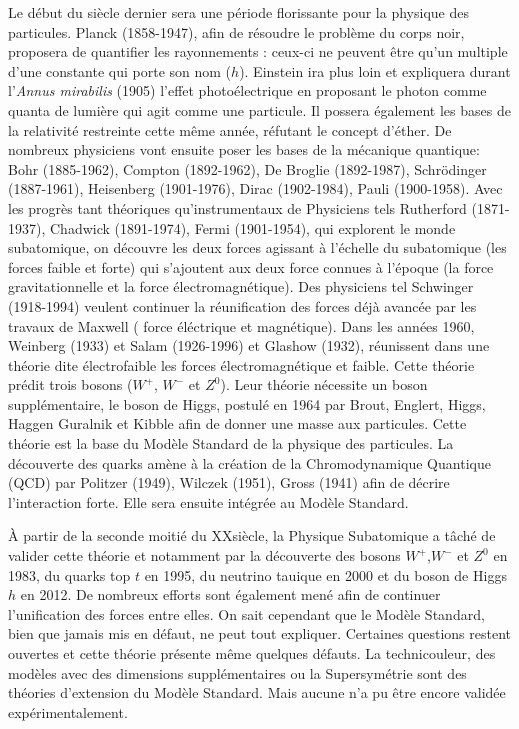 Le début du siècle dernier sera une période florissante pour la physique des particules. Planck (1858-1947), afin de résoudre le problème du corps noir, proposera de quantifier les rayonnements : ceux-ci ne peuvent être qu'un multiple d'une constante qui porte son nom ($h$). Einstein ira plus loin et expliquera durant l'\textit{Annus mirabilis} (1905) l'effet photoélectrique en proposant le photon comme quanta de lumière qui agit comme une particule. Il possera également les bases de la relativité restreinte cette même année, réfutant le concept d'éther. De nombreux physiciens vont ensuite poser les bases de la mécanique quantique: Bohr (1885-1962), Compton (1892-1962), De Broglie (1892-1987), Schrödinger (1887-1961), Heisenberg (1901-1976), Dirac (1902-1984), Pauli (1900-1958). Avec les progrès tant théoriques qu'instrumentaux de Physiciens tels  Rutherford (1871-1937), Chadwick (1891-1974), Fermi (1901-1954), qui explorent le monde subatomique, on découvre les deux forces agissant à l'échelle du subatomique (les forces faible et forte) qui s'ajoutent aux deux force connues à l'époque (la force gravitationnelle et la force électromagnétique). Des physiciens tel Schwinger (1918-1994) veulent continuer la réunification des forces déjà avancée par les travaux de Maxwell ( force éléctrique et magnétique). Dans les années 1960, Weinberg (1933) et Salam (1926-1996) et Glashow (1932), réunissent dans une théorie dite électrofaible les forces électromagnétique et faible. Cette théorie prédit trois bosons ($W^{+}$, $W^{-}$ et $Z^{0}$). Leur théorie nécessite un boson supplémentaire, le boson de Higgs, postulé en 1964 par Brout, Englert, Higgs, Haggen Guralnik et Kibble afin de donner une masse aux particules. Cette théorie est la base du Modèle Standard de la physique des particules. La découverte des quarks amène à la création de la Chromodynamique Quantique (QCD) par Politzer (1949), Wilczek (1951), Gross (1941) afin de décrire l'interaction forte. Elle sera ensuite intégrée au Modèle Standard.

À partir de la seconde moitié du XX\ieme siècle, la Physique Subatomique a tâché de valider cette théorie et notamment par la découverte des bosons  $W^{+}$,$W^{-}$ et $Z^{0}$ en 1983, du quarks top $t$ en 1995, du neutrino tauique en 2000 et du boson de Higgs $h$ en 2012. De nombreux efforts sont également mené afin de continuer l'unification des forces entre elles. On sait cependant que le Modèle Standard, bien que jamais mis en défaut, ne peut tout expliquer. Certaines questions restent ouvertes et cette théorie présente même quelques défauts. La technicouleur, des modèles avec des dimensions supplémentaires ou la Supersymétrie sont des théories d'extension du Modèle Standard. Mais aucune n'a pu être encore validée expérimentalement.

